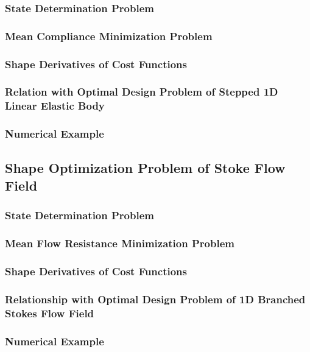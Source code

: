 \documentclass[oneside]{book}
\numberwithin{equation}{section}
\begin{document}
\subsubsection{State Determination Problem}

\subsubsection{Mean Compliance Minimization Problem}

\subsubsection{Shape Derivatives of Cost Functions}

\subsubsection{Relation with Optimal Design Problem of Stepped 1D Linear Elastic Body}

\subsubsection{Numerical Example}

\subsection{Shape Optimization Problem of Stoke Flow Field}

\subsubsection{State Determination Problem}

\subsubsection{Mean Flow Resistance Minimization Problem}

\subsubsection{Shape Derivatives of Cost Functions}

\subsubsection{Relationship with Optimal Design Problem of 1D Branched Stokes Flow Field}

\subsubsection{Numerical Example}
\end{document}
